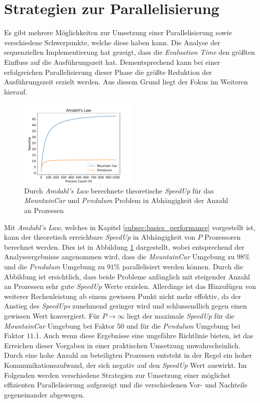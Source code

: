 \section{Strategien zur Parallelisierung}
\label{sec:parallel_strategies}
Es gibt mehrere Möglichkeiten zur Umsetzung einer Parallelisierung sowie verschiedene Schwerpunkte, welche diese haben kann. Die Analyse der sequenziellen Implementierung hat gezeigt, dass die \emph{Evaluation Time} den größten Einfluss auf die Ausführungszeit hat.  Dementsprechend kann bei einer erfolgreichen Parallelisierung dieser Phase die größte Reduktion der Ausführungszeit erzielt werden. Aus diesem Grund liegt der Fokus im Weiteren hierauf. 
\begin{figure}[!h]
	\centering
	\includegraphics[width=0.5\textwidth]{./img/ahmdals_law_mountain_pendulum.pdf} 
	\caption{Durch \emph{Amdahl's Law} berechnete theoretische \emph{SpeedUp} für das \emph{MountainCar} und \emph{Pendulum} Problem in Abhängigkeit der Anzahl an Prozessen}
	\label{fig:amdahls_law_mountain_pendulum}
\end{figure}
Mit \emph{Amdahl's Law}, welches in Kapitel \ref{subsec:basics_performance} vorgestellt ist, kann der theoretisch erreichbare \emph{SpeedUp} in Abhängigkeit von $P$ Prozessoren berechnet werden. Dies ist in Abbildung \ref{fig:amdahls_law_mountain_pendulum} dargestellt, wobei entsprechend der Analyseergebnisse angenommen wird, dass die \emph{MountainCar} Umgebung zu $98\%$ und die \emph{Pendulum} Umgebung zu $91\%$ parallelisiert werden können. Durch die Abbildung ist ersichtlich, dass beide Probleme anfänglich mit steigender Anzahl an Prozessen sehr gute \emph{SpeedUp} Werte erzielen. Allerdings ist das Hinzufügen von weiterer Rechenleistung ab einem gewissen Punkt nicht mehr effektiv, da der Anstieg des \emph{SpeedUps} zunehmend geringer wird und schlussendlich gegen einen gewissen Wert konvergiert. Für $P \rightarrow \infty$ liegt der maximale \emph{SpeedUp} für die \emph{MountainCar} Umgebung bei Faktor 50 und für die \emph{Pendulum} Umgebung bei Faktor $11.\overline{1}$. Auch wenn diese Ergebnisse eine ungefähre Richtlinie bieten, ist das Erreichen dieser Vorgaben in einer praktischen Umsetzung unwahrscheinlich. Durch eine hohe Anzahl an beteiligten Prozessen entsteht in der Regel ein hoher Kommunikationsaufwand, der sich negativ auf den \emph{SpeedUp} Wert auswirkt. Im Folgenden werden verschiedene Strategien zur Umsetzung einer möglichst effizienten Parallelisierung aufgezeigt und die verschiedenen Vor- und Nachteile gegeneinander abgewogen.
